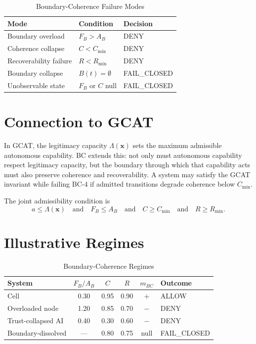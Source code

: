 \documentclass[letterpaper,10pt,conference]{ieeeconf}
\newcommand{\x}{\mathbf{x}}
\newcommand{\Lam}{\Lambda}
\newcommand{\FB}{F_B}
\newcommand{\AB}{A_B}
\newcommand{\Coh}{C}
\newcommand{\Rec}{R}
\begin{document}
\begin{table}[h]
\centering
\caption{Boundary-Coherence Failure Modes}
\begin{tabular}{lll}
\hline
Mode & Condition & Decision \\
\hline
Boundary overload & $\FB > \AB$ & DENY \\
Coherence collapse & $\Coh < C_{\min}$ & DENY \\
Recoverability failure & $\Rec < R_{\min}$ & DENY \\
Boundary collapse & $B(t) = \emptyset$ & FAIL\_CLOSED \\
Unobservable state & $\FB$ or $\Coh$ null & FAIL\_CLOSED \\
\hline
\end{tabular}
\end{table}

\section{Connection to GCAT}

In GCAT, the legitimacy capacity $\Lam(\x)$ sets the maximum admissible autonomous capability. BC extends this: not only must autonomous capability respect legitimacy capacity, but the boundary through which that capability acts must also preserve coherence and recoverability. A system may satisfy the GCAT invariant while failing BC-4 if admitted transitions degrade coherence below $C_{\min}$.

The joint admissibility condition is
\[
a \le \Lam(\x) \quad \text{and} \quad \FB \le \AB \quad \text{and} \quad \Coh \ge C_{\min} \quad \text{and} \quad \Rec \ge R_{\min}.
\]

\section{Illustrative Regimes}

\begin{table}[h]
\centering
\caption{Boundary-Coherence Regimes}
\begin{tabular}{lccccl}
\hline
System & $\FB/\AB$ & $\Coh$ & $\Rec$ & $m_{BC}$ & Outcome \\
\hline
Cell & 0.30 & 0.95 & 0.90 & $+$ & ALLOW \\
Overloaded node & 1.20 & 0.85 & 0.70 & $-$ & DENY \\
Trust-collapsed AI & 0.40 & 0.30 & 0.60 & $-$ & DENY \\
Boundary-dissolved & --- & 0.80 & 0.75 & null & FAIL\_CLOSED \\
\hline
\end{tabular}
\end{table}
\end{document}
